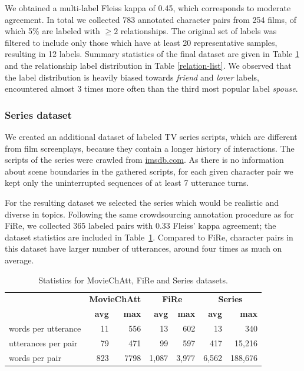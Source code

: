 We obtained a multi-label Fleiss kappa of 0.45, which corresponds to moderate agreement. In total we collected 783 annotated character pairs from 254 films, of which 5\% are labeled with $\ge 2$ relationships. The original set of labels was filtered to include only those which have at least 20 representative samples, resulting in 12 labels. Summary statistics of the final dataset are given in Table \ref{data_stats} and the relationship label distribution in Table \ref{relation-list}. We observed that the label distribution is heavily biased towards \emph{friend} and \emph{lover} labels, encountered almost 3 times more often than the third most popular label \emph{spouse}.

\subsubsection{Series dataset}

We created an additional dataset of labeled TV series scripts, which are different from film screenplays, because they contain a longer history of interactions. The scripts of the series were crawled from \url{imsdb.com}. As there is no information about scene boundaries in the gathered scripts, for each given character pair we kept only the uninterrupted sequences of at least 7 utterance turns. 

For the resulting dataset we selected the series which would be realistic and diverse in topics. Following the same crowdsourcing annotation procedure as for FiRe, we collected 365 labeled pairs with 0.33 Fleiss' kappa agreement; the dataset statistics are included in Table~\ref{data_stats}. Compared to FiRe, character pairs in this dataset have larger number of utterances, around four times as much on average.

\begin{table}[]
    \centering
    \begin{adjustbox}{width=0.65\textwidth}
    \begin{tabular}{@{}lrrrrrr@{}}
                  & \multicolumn{2}{c}{\textbf{MovieChAtt}}  & \multicolumn{2}{c}{\textbf{FiRe}} & \multicolumn{2}{c}{\textbf{Series}}                           \\
                    \cmidrule(lr){2-3} \cmidrule(l){4-5} \cmidrule(l){6-7}
                    & \textbf{avg}      & \textbf{max}        & \textbf{avg}      & \textbf{max} & \textbf{avg}      & \textbf{max} \\ \toprule
words per utterance & 11 & 556 & 13           & 602        & 13                          & 340                     \\
utterances per pair & 79 & 471 & 99           & 597        & \multicolumn{1}{r}{417}     & 15,216                   \\
words per pair  & 823 & 7798    & 1,087        & 3,977      &        6,562              &  188,676     
\end{tabular}
\end{adjustbox}
    \caption{Statistics for MovieChAtt, FiRe and Series datasets.}
    \label{data_stats}
\end{table}

